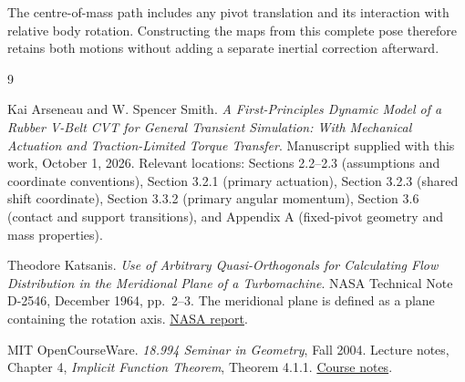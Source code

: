 \documentclass[11pt,letterpaper]{article}
\numberwithin{equation}{section}
\begin{document}
The centre-of-mass path includes any pivot translation and its interaction with relative body rotation. Constructing the maps from this complete pose therefore retains both motions without adding a separate inertial correction afterward.

\clearpage
\begingroup
\raggedright
\begin{thebibliography}{9}
Kai Arseneau and W. Spencer Smith.
\emph{A First-Principles Dynamic Model of a Rubber V-Belt CVT for General Transient Simulation: With Mechanical Actuation and Traction-Limited Torque Transfer}.
Manuscript supplied with this work, October 1, 2026.
Relevant locations: Sections 2.2--2.3 (assumptions and coordinate conventions), Section 3.2.1 (primary actuation), Section 3.2.3 (shared shift coordinate), Section 3.3.2 (primary angular momentum), Section 3.6 (contact and support transitions), and Appendix A (fixed-pivot geometry and mass properties).

Theodore Katsanis.
\emph{Use of Arbitrary Quasi-Orthogonals for Calculating Flow Distribution in the Meridional Plane of a Turbomachine}.
NASA Technical Note D-2546, December 1964, pp.~2--3.
The meridional plane is defined as a plane containing the rotation axis.
\href{https://ntrs.nasa.gov/api/citations/19650002705/downloads/19650002705.pdf}{NASA report}.

MIT OpenCourseWare.
\emph{18.994 Seminar in Geometry}, Fall 2004.
Lecture notes, Chapter 4, \emph{Implicit Function Theorem}, Theorem 4.1.1.
\href{https://ocw.mit.edu/courses/18-994-seminar-in-geometry-fall-2004/6e9f9f4820f735f233f28531a3a43a3a_chapter4.pdf}{Course notes}.
\end{thebibliography}
\endgroup
\end{document}
